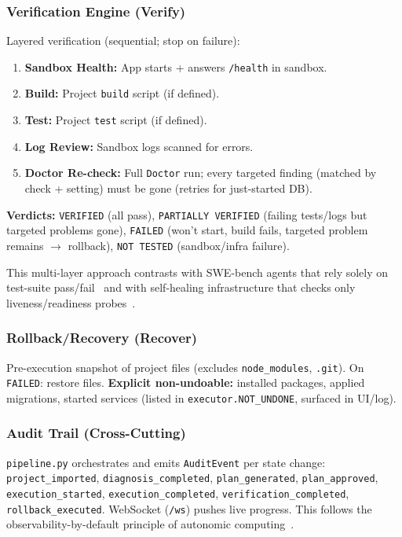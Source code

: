 \documentclass[conference,10pt,caption=false]{IEEEtran}
\begin{document}
\subsubsection{Verification Engine (Verify)}
\label{sec:verification}
Layered verification (sequential; stop on failure):
\begin{enumerate}[leftmargin=*, nosep]
    \item \textbf{Sandbox Health:} App starts + answers \texttt{/health} in sandbox.
    \item \textbf{Build:} Project \texttt{build} script (if defined).
    \item \textbf{Test:} Project \texttt{test} script (if defined).
    \item \textbf{Log Review:} Sandbox logs scanned for errors.
    \item \textbf{Doctor Re-check:} Full \texttt{Doctor} run; every targeted finding (matched by check + setting) must be gone (retries for just-started DB).
\end{enumerate}
\textbf{Verdicts:} \texttt{VERIFIED} (all pass), \texttt{PARTIALLY VERIFIED} (failing tests/logs but targeted problems gone), \texttt{FAILED} (won't start, build fails, targeted problem remains $\to$ rollback), \texttt{NOT TESTED} (sandbox/infra failure).

This multi-layer approach contrasts with SWE-bench agents that rely solely on test-suite pass/fail~\cite{swe-bench} and with self-healing infrastructure that checks only liveness/readiness probes~\cite{k8s-operators}.

\subsubsection{Rollback/Recovery (Recover)}
\label{sec:rollback}
Pre-execution snapshot of project files (excludes \texttt{node\_modules}, \texttt{.git}). On \texttt{FAILED}: restore files. \textbf{Explicit non-undoable:} installed packages, applied migrations, started services (listed in \texttt{executor.NOT\_UNDONE}, surfaced in UI/log).

\subsubsection{Audit Trail (Cross-Cutting)}
\label{sec:audit}
\texttt{pipeline.py} orchestrates and emits \texttt{AuditEvent} per state change: \texttt{project\_imported}, \texttt{diagnosis\_completed}, \texttt{plan\_generated}, \texttt{plan\_approved}, \texttt{execution\_started}, \texttt{execution\_completed}, \texttt{verification\_completed}, \texttt{rollback\_executed}. WebSocket (\texttt{/ws}) pushes live progress. This follows the observability-by-default principle of autonomic computing~\cite{autonomic2001}.
\end{document}
